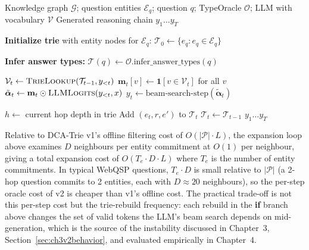 \begin{algorithm}[H]
  \caption{DCA-Trie v2: Step-Wise Symbolic Expansion}
  \label{alg:appd_v2}
  \small
  \begin{algorithmic}[1]
    \Require Knowledge graph $\mathcal{G}$; question entities $\mathcal{E}_q$;
    question $q$; TypeOracle $\mathcal{O}$; LLM with vocabulary $\mathcal{V}$
    \Ensure Generated reasoning chain $y_1 \ldots y_T$

    \State \textbf{Initialize trie} with entity nodes for $\mathcal{E}_q$:
    $\mathcal{T}_0 \gets \{e_q : e_q \in \mathcal{E}_q\}$

    \State \textbf{Infer answer types:}
    $\mathcal{T}(q) \gets \mathcal{O}.\text{infer\_answer\_types}(q)$

    \State $\mathcal{V}_t \gets \textsc{TrieLookup}(\mathcal{T}_{t-1}, y_{<t})$
    \State $\mathbf{m}_t[v] \gets \mathbf{1}[v \in \mathcal{V}_t]$ for all $v$
    \State $\tilde{\boldsymbol{\alpha}}_t \gets \mathbf{m}_t \odot
      \textsc{LLMLogits}(y_{<t}, x)$
    \State $y_t \gets \text{beam-search-step}(\tilde{\boldsymbol{\alpha}}_t)$

    \State $h \gets$ current hop depth in trie
    \State Add $(e_t, r, e')$ to $\mathcal{T}_t$
    \EndIf
    \EndIf
    \EndFor
    \Else
    \State $\mathcal{T}_t \gets \mathcal{T}_{t-1}$
    \EndIf
    \EndFor
    \State \Return $y_1 \ldots y_T$
  \end{algorithmic}
\end{algorithm}

Relative to DCA-Trie v1's offline filtering cost of $O(|\mathcal{P}| \cdot L)$, the expansion loop above examines $D$ neighbours per entity commitment at $O(1)$ per neighbour, giving a total expansion cost of $O(T_e \cdot D \cdot L)$ where $T_e$ is the number of entity commitments. In typical WebQSP questions, $T_e \cdot D$ is small relative to $|\mathcal{P}|$ (a 2-hop question commits to 2 entities, each with $D \approx 20$ neighbours), so the per-step oracle cost of v2 is cheaper than v1's offline cost. The practical trade-off is not this per-step cost but the trie-rebuild frequency: each rebuild in the \textbf{if} branch above changes the set of valid tokens the LLM's beam search depends on mid-generation, which is the source of the instability discussed in Chapter~3, Section~\ref{sec:ch3v2behavior}, and evaluated empirically in Chapter~4.
